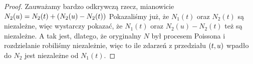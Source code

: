 \begin{proof}
	Zauważamy bardzo odkrywczą rzecz, mianowicie \( N_2(u) = N_2(t) + \left(N_2(u) - N_2(t)\right) \)
	Pokazaliśmy już, że \( N_1(t) \) oraz \( N_2(t) \) są niezależne, więc wystarczy pokazać, że
	\( N_1(t) \) oraz \(N_2(u) - N_2(t)\) też są niezależne.
	A tak jest, dlatego, że oryginalny \( N \) był procesem Poissona i rozdzielanie robiliśmy niezależnie, więc to ile zdarzeń z przedziału \( \left(t, u\right) \) wpadło do \( N_2 \) jest niezależne od \( N_1(t) \).
\end{proof}
